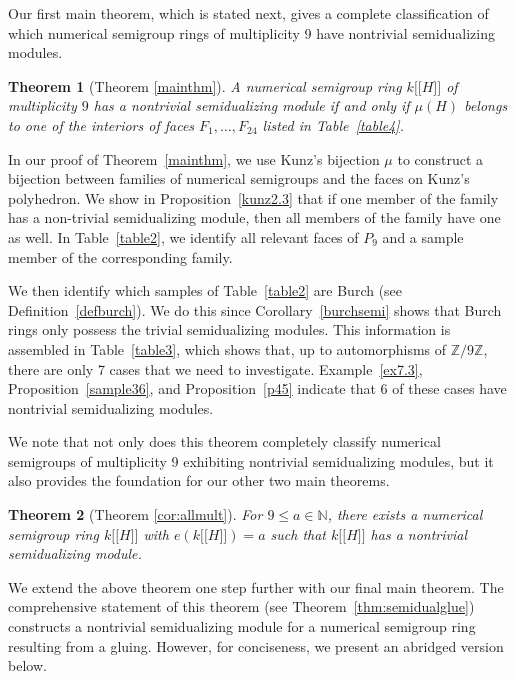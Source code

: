 \documentclass{amsart}
\newcommand{\ldb}{\mathopen{[\![}} %
\newcommand{\rdb}{\mathclose{]\!]}} %
\theoremstyle{plain}
\newtheorem{theorem}{Theorem}
\theoremstyle{definition}
\numberwithin{theorem}{section}
\numberwithin{equation}{section}
\numberwithin{equation}{theorem}
\begin{document}
Our first main theorem, which is stated next, gives a complete classification of which numerical semigroup rings of multiplicity 9  have nontrivial semidualizing modules.

\begin{theorem}[{Theorem \ref{mainthm}}]
A numerical semigroup ring $k \ldb H \rdb$ of multiplicity $9$ has a nontrivial semidualizing module if and only if $\mu(H)$ belongs to one of the interiors of faces $F_1,\dots,F_{24}$ listed in Table~\ref{table4}.
\end{theorem} 

In our proof of Theorem~\ref{mainthm}, we use Kunz’s bijection $\mu$ to construct a bijection between families of numerical semigroups and the faces on Kunz’s polyhedron. We show in Proposition~\ref{kunz2.3} that if one member of the family has a non-trivial semidualizing module, then all members of the family have one as well. 
In Table~\ref{table2}, we identify all relevant faces of $P_9$ and a sample member of the corresponding family. 

We then identify which samples of Table~\ref{table2} are Burch (see Definition~\ref{defburch}). We do this since Corollary~\ref{burchsemi} shows that Burch rings only possess the trivial semidualizing modules. This information is assembled in Table~\ref{table3}, which shows that, up to automorphisms of $\mathbb Z/9\mathbb Z$, there are only 7 cases that we need to investigate. Example~\ref{ex7.3}, Proposition~\ref{sample36}, and Proposition~\ref{p45} indicate that 6 of these cases have nontrivial semidualizing modules.


We note that not only does this theorem completely classify numerical semigroups of multiplicity 9 exhibiting nontrivial semidualizing modules, but it also provides the foundation for our other two main theorems.

\begin{theorem}[{Theorem \ref{cor:allmult}}]
For $9 \leq a \in \mathbb{N}$, there exists a numerical semigroup ring $k \ldb H \rdb$ with $e(k \ldb H \rdb) = a$ such that $k \ldb H \rdb$ has a nontrivial semidualizing module.
\end{theorem}

We extend the above theorem one step further with our final main theorem. The comprehensive statement of this theorem (see Theorem~\ref{thm:semidualglue}) constructs a nontrivial semidualizing module for a numerical semigroup ring  resulting from a gluing. However, for conciseness, we present an abridged version below.
\end{document}
